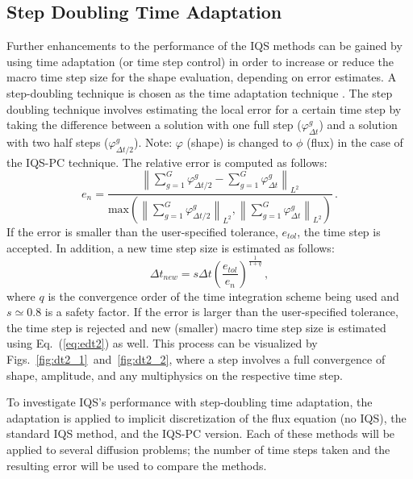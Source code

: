 \documentclass{elsarticle}
\newcommand{\eqt}[1]{Eq.~(\ref{#1})}                     %
\newcommand{\figs}[2]{Figs.~\ref{#1}~and~\ref{#2}}		%
\newcommand{\iqspc}{IQS-PC\xspace}
\newcommand{\be}{\begin{equation}}
\newcommand{\ee}{\end{equation}}
\newcommand{\norm}[1]{\left\lVert#1\right\rVert_{L^2}}
\begin{document}
\subsection{Step Doubling Time Adaptation}

Further enhancements to the performance of the IQS methods can be gained by using time adaptation (or time step control) in order to increase or reduce the macro time step size for the shape evaluation, depending on error estimates. A step-doubling technique is chosen as the time adaptation technique \cite{NumC}. The step doubling technique involves estimating the local error for a certain time step by taking the difference between a solution with one full step ($\varphi^g_{\Delta t}$) and a solution with two half steps ($\varphi^g_{\Delta t/2}$). Note: $\varphi$ (shape) is changed to $\phi$ (flux) in the case of the \iqspc technique. The relative error is computed as follows:
\be
e_n = \frac{\norm{\sum_{g=1}^G\varphi^g_{\Delta t/2} - \sum_{g=1}^G\varphi^g_{\Delta t}}}{\text{max}\left(\norm{\sum_{g=1}^G\varphi^g_{\Delta t/2}},\norm{\sum_{g=1}^G\varphi^g_{\Delta t}}\right)} \,.
\label{eq:edt2}
\ee
If the error is smaller than the user-specified tolerance, $e_{tol}$, the time step is accepted. In addition, a new time step size is estimated as follows:
\be
\Delta t_{new} = s \Delta t \left(\frac{e_{tol}}{e_n}\right)^{\frac{1}{1+q}} \,,
\label{eq:dt2}
\ee
where $q$ is the convergence order of the time integration scheme being used and $s\simeq 0.8$ is a safety factor. If the error is larger than the user-specified tolerance, the time step is rejected and new (smaller) macro time step size is estimated using \eqt{eq:edt2} as well. This process can be visualized by \figs{fig:dt2_1}{fig:dt2_2}, where a step involves a full convergence of shape, amplitude, and any multiphysics on the respective time step.

To investigate IQS's performance with step-doubling time adaptation, the adaptation is applied to implicit discretization of the flux equation (no IQS), the standard IQS method, and the \iqspc version. Each of these methods will be applied to several diffusion problems; the number of time steps taken and the resulting error will be used to compare the methods.
\end{document}
